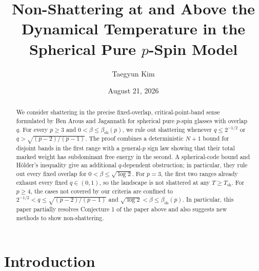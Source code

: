 \documentclass[11pt,reqno]{amsart}
\title[Non-shattering at and above the dynamical temperature]{Non-Shattering at and Above the Dynamical Temperature in the Spherical Pure \(p\)-Spin Model}
\author{Taegyun Kim}
\date{August 21, 2026}
\numberwithin{equation}{section}
\theoremstyle{plain}
\theoremstyle{definition}
\theoremstyle{remark}
\newcommand{\1}{\mathbf 1}
\begin{document}
\begin{abstract}
We consider shattering in the precise fixed-overlap, critical-point-band sense formulated by Ben Arous and Jagannath for spherical pure \(p\)-spin glasses with overlap \(q\).  For every \(p\geq3\) and \(0<\beta\leq\beta_{\mathrm{sh}}(p)\), we rule out shattering whenever \(q\leq2^{-1/2}\) or \(q>\sqrt{(p-2)/(p-1)}\).  The proof combines a deterministic \(N+1\) bound for disjoint bands in the first range with a general-\(p\) sign law showing that their total marked weight has subdominant free energy in the second.  A spherical-code bound and H\"older's inequality give an additional \(q\)-dependent obstruction; in particular, they rule out every fixed overlap for \(0<\beta\leq\sqrt{\log2}\).  For \(p=3\), the first two ranges already exhaust every fixed \(q\in(0,1)\), so the landscape is not shattered at any \(T\geq T_{\mathrm{sh}}\).  For \(p\geq4\), the cases not covered by our criteria are confined to \(2^{-1/2}<q\leq\sqrt{(p-2)/(p-1)}\) and \(\sqrt{\log2}<\beta\leq\beta_{\mathrm{sh}}(p)\).  In particular, this paper partially resolves Conjecture 1 of the paper above and also suggests new methods to show non-shattering.
\end{abstract}

\maketitle

\section{Introduction}
\end{document}
